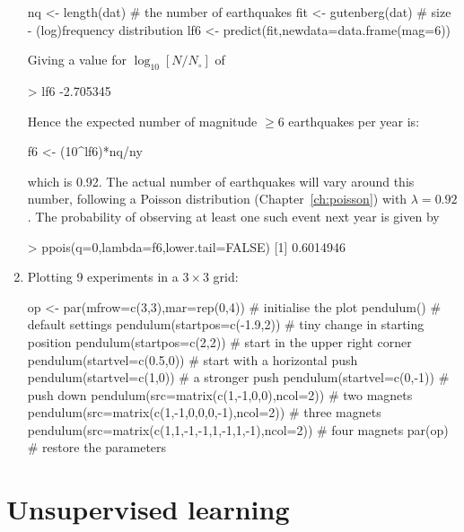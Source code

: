 \begin{enumerate}
\begin{script}[firstnumber=6]
nq <- length(dat)           # the number of earthquakes
fit <- gutenberg(dat)       # size - (log)frequency distribution
lf6 <- predict(fit,newdata=data.frame(mag=6))
\end{script}

Giving a value for $\log_{10}[N/N_\circ]$ of

\begin{console}
> lf6
-2.705345 
\end{console}

Hence the expected number of magnitude $\geq{6}$ earthquakes per year
is:

\begin{script}[firstnumber=9]
f6 <- (10^lf6)*nq/ny
\end{script}

\noindent which is 0.92. The actual number of earthquakes will vary
around this number, following a Poisson distribution
(Chapter~\ref{ch:poisson}) with $\lambda=0.92$. The probability of
observing at least one such event next year is given by

\begin{console}
> ppois(q=0,lambda=f6,lower.tail=FALSE)
[1] 0.6014946
\end{console}

\item Plotting 9 experiments in a ${3}\times{3}$ grid:

\begin{script}
op <- par(mfrow=c(3,3),mar=rep(0,4)) # initialise the plot
pendulum()                           # default settings
pendulum(startpos=c(-1.9,2))         # tiny change in starting position
pendulum(startpos=c(2,2))            # start in the upper right corner
pendulum(startvel=c(0.5,0))          # start with a horizontal push
pendulum(startvel=c(1,0))            # a stronger push
pendulum(startvel=c(0,-1))           # push down
pendulum(src=matrix(c(1,-1,0,0),ncol=2))             # two magnets
pendulum(src=matrix(c(1,-1,0,0,0,-1),ncol=2))        # three magnets
pendulum(src=matrix(c(1,1,-1,-1,1,-1,1,-1),ncol=2))  # four magnets
par(op)                              # restore the parameters
\end{script}
  
\end{enumerate}

\section{Unsupervised learning}
\label{sec:sol-unsupervised}

